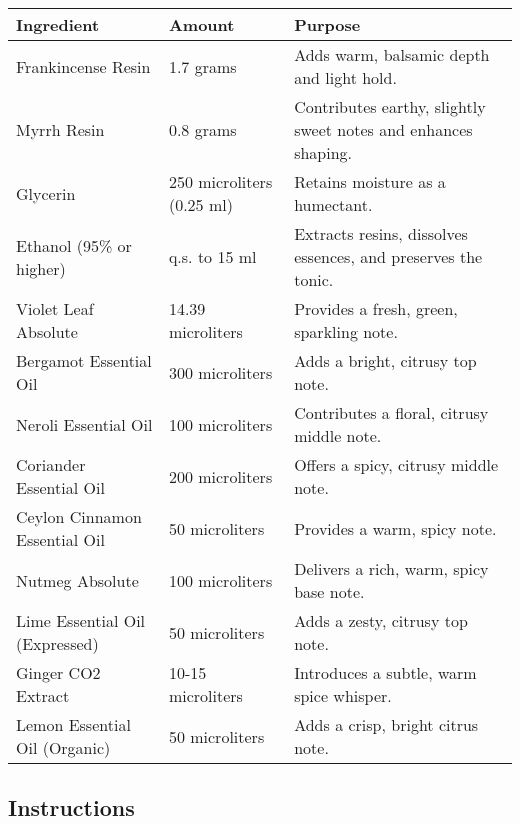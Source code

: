 \documentclass{article}
\begin{document}
\begin{center}
\begin{tabular}{p{4.5cm} p{2.5cm} p{8cm}}
\toprule
\textbf{Ingredient} & \textbf{Amount} & \textbf{Purpose} \\
\midrule
Frankincense Resin & 1.7 grams & Adds warm, balsamic depth and light hold. \\
Myrrh Resin & 0.8 grams & Contributes earthy, slightly sweet notes and enhances shaping. \\
Glycerin & 250 microliters (0.25 ml) & Retains moisture as a humectant. \\
Ethanol (95\% or higher) & q.s. to 15 ml & Extracts resins, dissolves essences, and preserves the tonic. \\
Violet Leaf Absolute & 14.39 microliters & Provides a fresh, green, sparkling note. \\
Bergamot Essential Oil & 300 microliters & Adds a bright, citrusy top note. \\
Neroli Essential Oil & 100 microliters & Contributes a floral, citrusy middle note. \\
Coriander Essential Oil & 200 microliters & Offers a spicy, citrusy middle note. \\
Ceylon Cinnamon Essential Oil & 50 microliters & Provides a warm, spicy note. \\
Nutmeg Absolute & 100 microliters & Delivers a rich, warm, spicy base note. \\
Lime Essential Oil (Expressed) & 50 microliters & Adds a zesty, citrusy top note. \\
Ginger CO2 Extract & 10-15 microliters & Introduces a subtle, warm spice whisper. \\
Lemon Essential Oil (Organic) & 50 microliters & Adds a crisp, bright citrus note. \\
\bottomrule
\end{tabular}
\end{center}

\subsection*{Instructions}
\end{document}
